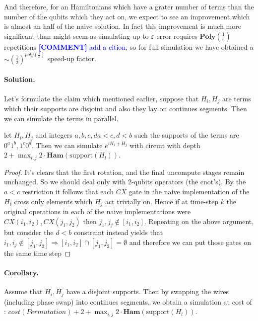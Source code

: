 \documentclass{article}
\newcommand{\commentt}[1]{\textcolor{blue}{ \textbf{[COMMENT]} #1}}
\newcommand{\ctt}[1]{\commentt{#1}}
\begin{document}
And therefore, for an Hamiltonians which have a grater number of terms than the number of the qubits which they act on, we expect to see an improvement which is almost an half of the naive solution. In fact this improvement is much more significant than might seem as simulating up to \(\varepsilon\)-error requires \(\textbf{Poly} \left( \frac{1}{\varepsilon} \right) \) repetitions\ctt{add a cition}, so for full simulation we have obtained a \( \sim (\frac{1}{2})^{poly(\frac{1}{\varepsilon})} \) speed-up factor.  

\paragraph{Solution.} Let's formulate the claim which mentioned earlier, suppose that \(H_{i} ,H_{j}\) are terms which their supports are disjoint and also they lay on continues segments. Then we can simulate the terms in parallel. 
\begin{lemma} let \(H_{i}, H_{j}\) and integers \(a,b,c,d a < c, d < b\) such the supports of the terms are \( 0^{a}1^{b}, 1^{c}0^{d}\). Then we can simulate \(e^{i H_{i} + H_{j}}\) with circuit with depth \( 2 + \max_{ {i,j} } 2 \cdot \textbf{Ham} ( \text{support} ( H_{l} ) )\).
\end{lemma}
\begin{proof} It's clears that the first rotation, and the final uncompute stages remain unchanged. So we should deal only with 2-qubits operators (the cnot's). By the \( a < c \) restriction it follows that each \(CX\) gate in the naive implementation of the \(H_i\) cross only elements which \(H_j\) act trivially on. Hence if at time-step \(k\) the original operations in each of the naive implementations were \( CX(i_{1} , i_{2}), CX(j_{1} , j_{2}) \) then \( j_{1}, j_{j} \notin [i_{1} , i_{2}] \). Repeating on the above argument, but consider the \(d<b\) constraint instead yields that \( i_{1}, i_{j} \notin [j_{1} , j_{2}] \Rightarrow [i_{1},i_{2}]\cap[j_{1},j_{2}] = \emptyset  \) and therefore we can put those gates on the same time step   
\end{proof}
\paragraph{Corollary.} Assume that \(H_{i}, H_{j}\) have a disjoint supports. Then by swapping the wires (including phase swap) into continues segments, we obtain a simulation at cost of : \( cost( Permutation ) + 2 + \max_{ {i,j} } 2 \cdot \textbf{Ham} ( \text{support} ( H_{l} ) )\).  
\end{document}
